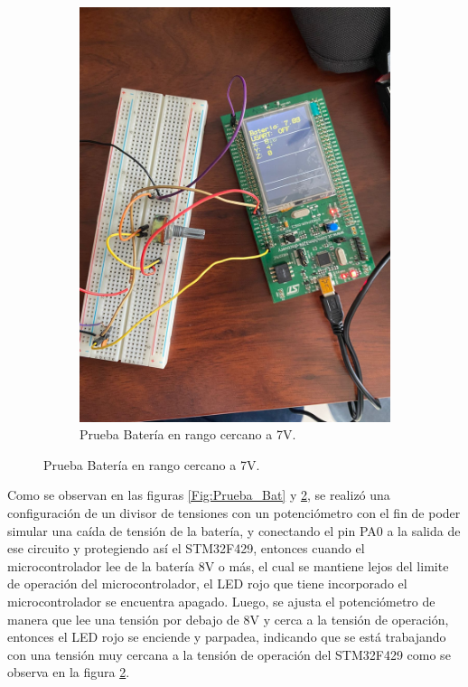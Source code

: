 \begin{figure}[H]
\begin{subfigure}{0.5\textwidth}
        \includegraphics[width=\textwidth]{Imagenes/Prueba_Bat2.jpg} 
        \caption{Prueba Batería en rango cercano a 7V.}
        \label{Fig:Prueba_Bat2}
    \end{subfigure}
    \end{figure}

Como se observan en las figuras \ref{Fig:Prueba_Bat} y \ref{Fig:Prueba_Bat2}, se realizó una configuración de un divisor de tensiones con un potenciómetro con el fin de poder simular una caída de tensión de la batería, y conectando el pin PA0 a la salida de ese circuito y protegiendo así el STM32F429, entonces cuando el microcontrolador lee de la batería 8V o más, el cual se mantiene lejos del limite de operación del microcontrolador, el LED rojo que tiene incorporado el microcontrolador se encuentra apagado. Luego, se ajusta el potenciómetro de manera que lee una tensión por debajo de 8V y cerca a la tensión de operación, entonces el LED rojo se enciende y parpadea, indicando que se está trabajando con una tensión muy cercana a la tensión de operación del STM32F429 como se observa en la figura \ref{Fig:Prueba_Bat2}.


